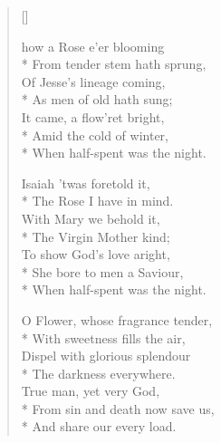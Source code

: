 \newHymn


\begin{verse}[\versewidth]
\begin{altverse}
 how a Rose e'er blooming\\*
From tender stem hath sprung,\\
Of Jesse's lineage coming,\\*
As men of old hath sung;\\
It came, a flow'ret bright,\\*
Amid the cold of winter,\\*
When half-spent was the night.
\end{altverse}

\begin{altverse}
Isaiah 'twas foretold it,\\*
The Rose I have in mind.\\
With Mary we behold it,\\*
The Virgin Mother kind;\\
To show God's love aright,\\*
She bore to men a Saviour,\\*
When half-spent was the night.
\end{altverse}

\begin{altverse}
O Flower, whose fragrance tender,\\*
With sweetness fills the air,\\
Dispel with glorious splendour\\*
The darkness everywhere.\\
True man, yet very God,\\*
From sin and death now save us,\\*
And share our every load.
\end{altverse}
\end{verse}



